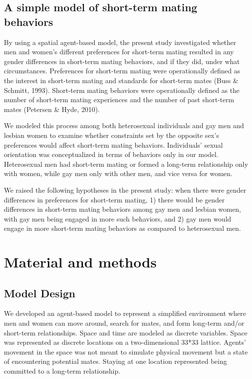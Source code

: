 \documentclass[
  11pt,
]{article}
\begin{document}
\hypertarget{a-simple-model-of-short-term-mating-behaviors}{%
\subsection{A simple model of short-term mating
behaviors}\label{a-simple-model-of-short-term-mating-behaviors}}

By using a spatial agent-based model, the present study investigated
whether men and women's different preferences for short-term mating
resulted in any gender differences in short-term mating behaviors, and
if they did, under what circumstances. Preferences for short-term mating
were operationally defined as the interest in short-term mating and
standards for short-term mates (Buss \& Schmitt, 1993). Short-term
mating behaviors were operationally defined as the number of short-term
mating experiences and the number of past short-term mates (Petersen \&
Hyde, 2010).

We modeled this process among both heterosexual individuals and gay men
and lesbian women to examine whether constraints set by the opposite
sex's preferences would affect short-term mating behaviors. Individuals'
sexual orientation was conceptualized in terms of behaviors only in our
model. Heterosexual men had short-term mating or formed a long-term
relationship only with women, while gay men only with other men, and
vice versa for women.

We raised the following hypotheses in the present study: when there were
gender differences in preferences for short-term mating, 1) there would
be gender differences in short-term mating behaviors among gay men and
lesbian women, with gay men being engaged in more such behaviors, and 2)
gay men would engage in more short-term mating behaviors as compared to
heterosexual men.

\hypertarget{material-and-methods}{%
\section{Material and methods}\label{material-and-methods}}

\hypertarget{model-design}{%
\subsection{Model Design}\label{model-design}}

We developed an agent-based model to represent a simplified environment
where men and women can move around, search for mates, and form
long-term and/or short-term relationships. Space and time are modeled as
discrete variables. Space was represented as discrete locations on a
two-dimensional 33*33 lattice. Agents' movement in the space was not
meant to simulate physical movement but a state of encountering
potential mates. Staying at one location represented being committed to
a long-term relationship.
\end{document}
